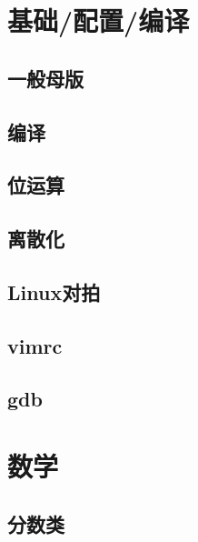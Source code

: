 \documentclass[10pt]{article}
\begin{document}
\tableofcontents
\newpage
\section{基础/配置/编译}
\subsection{一般母版}


\subsection{编译}


\subsection{位运算}


\subsection{离散化}


\subsection{Linux对拍}


\subsection{vimrc}


\subsection{gdb}

\section{数学}
\subsection{分数类}

\end{document}
